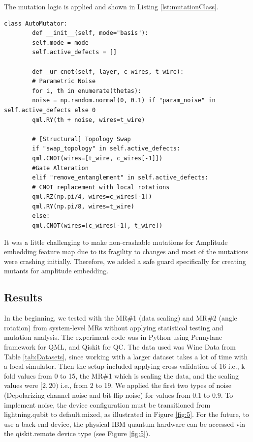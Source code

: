 \documentclass[12pt,a4paper]{article}
\begin{document}
	The mutation logic is applied and shown in Listing \ref{lst:mutationClass}.
	
	
	
	\begin{lstlisting}[caption=Dynamic Mutator Sample, label={lst:mutationClass}]
		class AutoMutator:
		def __init__(self, mode="basis"):
		self.mode = mode
		self.active_defects = [] 
		
		def _ur_cnot(self, layer, c_wires, t_wire):
		# Parametric Noise
		for i, th in enumerate(thetas):
		noise = np.random.normal(0, 0.1) if "param_noise" in self.active_defects else 0
		qml.RY(th + noise, wires=t_wire)
		
		# [Structural] Topology Swap
		if "swap_topology" in self.active_defects:
		qml.CNOT(wires=[t_wire, c_wires[-1]])
		#Gate Alteration
		elif "remove_entanglement" in self.active_defects:
		# CNOT replacement with local rotations
		qml.RZ(np.pi/4, wires=c_wires[-1]) 
		qml.RY(np.pi/8, wires=t_wire)
		else:
		qml.CNOT(wires=[c_wires[-1], t_wire])
	\end{lstlisting}
	
	It was a little challenging to make non-crashable mutations for Amplitude embedding feature map due to its fragility to changes and most of the mutations were crashing initially. Therefore, we added a safe guard specifically for creating mutants for amplitude embedding. 
	
	\subsection{Results}
		\label{sec:results}
		
		In the beginning, we tested with the MR\#1 (data scaling) and MR\#2 (angle rotation) from system-level MRs without applying statistical testing and mutation analysis. The experiment code was in Python using Pennylane framework for QML, and Qiskit for QC. The data used was Wine Data from Table \ref{tab:Datasets}, since working with a larger dataset takes a lot of time with a local simulator. Then the setup included applying cross-validation of 16 i.e., k-fold values from 0 to 15, the MR\#1 which is scaling the data, and the scaling values were $[2,20)$ i.e., from 2 to 19. We applied the first two types of noise (Depolarizing channel noise and bit-flip noise) for values from 0.1 to 0.9. To implement noise, the device configuration must be transitioned from lightning.qubit to default.mixed, as illustrated in Figure \ref{fig:5}. For the future, to use a back-end device, the physical IBM quantum hardware can be accessed via the qiskit.remote device type (see Figure \ref{fig:5}).
		
\end{document}
